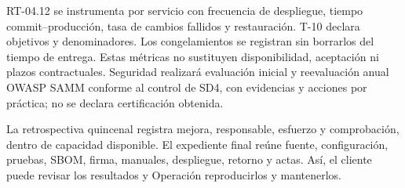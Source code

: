 RT-04.12 se instrumenta por servicio con frecuencia de despliegue, tiempo commit--producción, tasa de cambios fallidos y restauración. T-10 declara objetivos y denominadores. Los congelamientos se registran sin borrarlos del tiempo de entrega. Estas métricas no sustituyen disponibilidad, aceptación ni plazos contractuales. Seguridad realizará evaluación inicial y reevaluación anual OWASP SAMM conforme al control de SD4, con evidencias y acciones por práctica; no se declara certificación obtenida. \parencites[RT-04.12, p.~11; RT-11.28, p.~24]{sd6-bt}{sd6-samm}

La retrospectiva quincenal registra mejora, responsable, esfuerzo y comprobación, dentro de capacidad disponible. El expediente final reúne fuente, configuración, pruebas, SBOM, firma, manuales, despliegue, retorno y actas. Así, el cliente puede revisar los resultados y Operación reproducirlos y mantenerlos.
